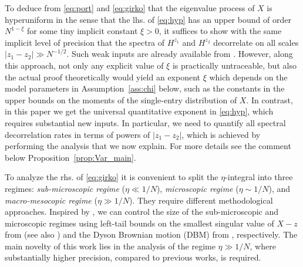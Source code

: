 \documentclass[10pt]{amsart}
\numberwithin{equation}{section}
\begin{document}
To deduce from \eqref{eq:port} and \eqref{eq:girko} that the eigenvalue process of $X$ is hyperuniform in the sense that  the lhs. of \eqref{eq:hyp} has an upper bound of order $N^{1-\xi}$ for some tiny implicit constant $\xi>0$, it suffices to show with the same implicit level of precision that the spectra of $H^{z_1}$ and $H^{z_2}$ decorrelate on all scales $|z_1-z_2|\gg N^{-1/2}$. Such weak inputs are already available from \cite{macroCLT_complex}. However, along this approach, not only any explicit value of $\xi$ is practically untraceable, but also  the actual proof theoretically would yield an exponent $\xi$ which depends on the model parameters in Assumption~\ref{ass:chi} below, such as the constants in the upper bounds on the moments of the single-entry distribution of $X$. In contrast, in this paper we get the universal quantitative exponent in \eqref{eq:hyp}, which requires substantial new inputs. In particular, we need to quantify all spectral decorrelation rates in terms of powers of $|z_1-z_2|$, which is achieved by performing the analysis that we now explain. For more details see the comment below Proposition~\ref{prop:Var_main}.


To analyze the rhs. of \eqref{eq:girko} it is convenient to split the $\eta$-integral into three regimes: \emph{sub-microscopic regime} ($\eta\ll 1/N$), \emph{microscopic regime} ($\eta\sim 1/N$), and \emph{macro-mesocopic regime} ($\eta\gg 1/N$). They require different methodological approaches. Inspired by \cite{macroCLT_complex}, we can control the size of the sub-microscopic and microscopic regimes using left-tail bounds on the smallest singular value of $X-z$ from \cite{bordenave2012around, tao2010smooth} (see also \cite{cipolloni2020optimal, cipolloni2022condition}) and the Dyson Brownian motion (DBM) from \cite{bourgade2024fluctuations, macroCLT_complex}, respectively. The main novelty of this work lies in the analysis of the regime $\eta\gg 1/N$, where substantially higher precision, compared to previous works, is required.
\end{document}
